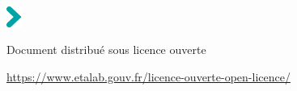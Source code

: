 \hspace{-1cm}
\setlength{\parindent}{0cm}
\includegraphics[width=0.5cm]{_extensions/quarto-inrae/ressources/fleche-titre}\hspace{0.3cm}\textcolor{inrae}{\sffamily\Huge\bfseries \inserttitle}\par\bigskip

\hspace{-1cm}\textcolor{inrae}{\sffamily \insertdate}\par

\hspace{-1cm}\textcolor{inraefonce}{\sffamily \insertauthor}\par

\vspace*{0.25cm}

\hspace{-1.3cm}
\textcolor{inraefonce}{\sffamily
Document distribué sous licence ouverte}\par
\vspace*{-0.3cm}
\hspace{-1.1cm} \href{https://www.etalab.gouv.fr/licence-ouverte-open-licence/}{https://www.etalab.gouv.fr/licence-ouverte-open-licence/}

\restoregeometry


